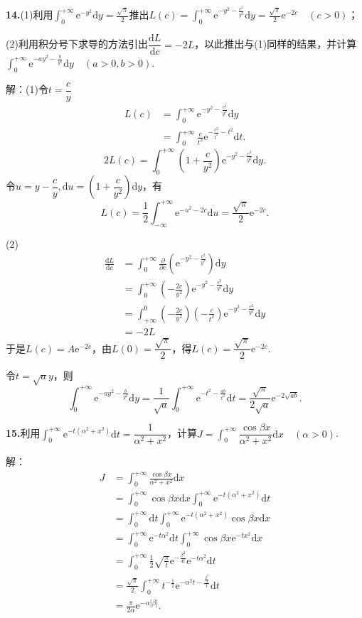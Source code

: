 \documentclass[12pt, a4paper]{article}
\newcommand{\e}{\mathrm{e}}
\newcommand{\dif}{\mathrm{d}}
\begin{document}
\textbf{14.}(1)利用\(\int_{0}^{+\infty} \e^{-y^2}\dif y = \frac{\sqrt{\pi}}{2}\)推出\(L(c) = \int_{0}^{+\infty} \e^{-y^2 - \frac{c^2}{y^2}}\dif y = \frac{\sqrt{\pi}}{2}\e^{-2c} \quad (c > 0)\)；

(2)利用积分号下求导的方法引出\(\dfrac{\dif L}{\dif c} = -2L\)，以此推出与(1)同样的结果，并计算\(\int_{0}^{+\infty} \e^{-ay^2 - \frac{b}{y^2}}\dif y \quad (a > 0, b > 0)\).

解：(1)令\(t = \dfrac{c}{y}\)
\begin{align*}
L(c) &= \int_{0}^{+\infty} \e^{-y^2 - \frac{c^2}{y^2}}\dif y \\
&= \int_{0}^{+\infty} \frac{c}{t^2}\e^{-\frac{c^2}{t^2} - t^2}\dif t.
\end{align*}
\[2L(c) = \int_{0}^{+\infty} \left(1 + \frac{c}{y^2}\right)\e^{-y^2 - \frac{c^2}{y^2}}\dif y.\]
令\(u = y - \dfrac{c}{y}, \dif u = \left(1 + \dfrac{c}{y^2}\right)\dif y\)，有
\[L(c) = \frac{1}{2}\int_{-\infty}^{+\infty} \e^{-u^2 - 2c}\dif u = \frac{\sqrt{\pi}}{2}\e^{-2c}.\]

(2)
\begin{align*}
\frac{\dif L}{\dif c} &= \int_{0}^{+\infty} \frac{\partial}{\partial c}\left(\e^{-y^2 - \frac{c^2}{y^2}}\right)\dif y \\
&= \int_{0}^{+\infty} \left(-\frac{2c}{y^2}\right)\e^{-y^2 - \frac{c^2}{y^2}}\dif y \\
&= \int_{+\infty}^{0} \left(-\frac{2c}{y^2}\right)\left(-\frac{c}{t^2}\right)\e^{-y^2 - \frac{c^2}{y^2}}\dif y \\
&= -2L
\end{align*}
于是\(L(c) = A\e^{-2c}\)，由\(L(0) = \dfrac{\sqrt{\pi}}{2}\)，得\(L(c) = \dfrac{\sqrt{\pi}}{2}\e^{-2c}\).

令\(t = \sqrt{a}y\)，则
\[\int_{0}^{+\infty} \e^{-ay^2 - \frac{b}{y^2}}\dif y = \frac{1}{\sqrt{a}}\int_{0}^{+\infty} \e^{-t^2 - \frac{ab}{t^2}}\dif t = \frac{\sqrt{\pi}}{2\sqrt{a}}\e^{-2\sqrt{ab}}.\]

\textbf{15.}利用\(\int_{0}^{+\infty} \e^{-t(\alpha^2 + x^2)}\dif t = \dfrac{1}{\alpha^2 + x^2}\)，计算\(J = \int_{0}^{+\infty} \dfrac{\cos\beta x}{\alpha^2 + x^2}\dif x \quad (\alpha > 0)\).

解：
\begin{align*}
J &= \int_{0}^{+\infty} \frac{\cos\beta x}{\alpha^2 + x^2}\dif x \\
&= \int_{0}^{+\infty} \cos\beta x\dif x\int_{0}^{+\infty} \e^{-t(\alpha^2 + x^2)}\dif t \\
&= \int_{0}^{+\infty} \dif t\int_{0}^{+\infty} \e^{-t(\alpha^2 + x^2)}\cos\beta x\dif x \\
&= \int_{0}^{+\infty} \e^{-t\alpha^2}\dif t \int_{0}^{+\infty} \cos\beta x\e^{-tx^2}\dif x \\
&= \int_{0}^{+\infty} \frac{1}{2}\sqrt{\frac{\pi}{t}}\e^{-\frac{\beta^2}{4t}}\e^{-t\alpha^2}\dif t \\
&= \frac{\sqrt{\pi}}{2} \int_{0}^{+\infty} t^{-\frac{1}{2}}\e^{-\alpha^2t - \frac{\frac{\beta^2}{4}}{t}}\dif t \\
&= \frac{\pi}{2\alpha}\e^{-\alpha|\beta|}.
\end{align*}
\end{document}
